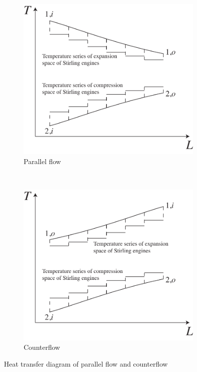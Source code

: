 \noindent \begin{figure}[htbp]
\centering
	\begin{subfigure}[b]{0.4\columnwidth}
	\includegraphics[width = \columnwidth]{fig/HeatTransfer_Parallel.pdf}
	\caption{Parallel flow}\label{fig:ParallelFlow}
	\end{subfigure}
	~
\begin{subfigure}[b]{0.4\columnwidth}
	\includegraphics[width = \columnwidth]{fig/HeatTransfer_Counter.pdf}
	\caption{Counterflow}\label{fig:CounterFlow}
	\end{subfigure}
	\caption{Heat transfer diagram of parallel flow and counterflow}
	\label{fig:twoFlowTypes}
\end{figure}

